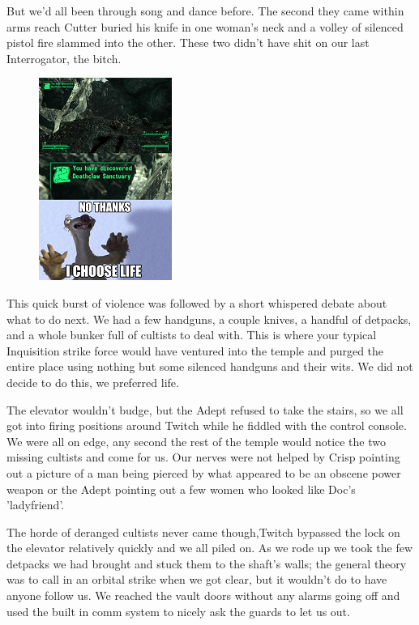 But we'd all been through song and dance before. 
The second they came within arms reach Cutter buried his knife in one woman's neck and a volley of silenced pistol fire slammed into the other. 
These two didn't have shit on our last Interrogator, the bitch.

\begin{figure}
	\begin{center}
		\includegraphics[width=\figwidth]{pics/6/17.png}
	\end{center}
\end{figure}
This quick burst of violence was followed by a short whispered debate about what to do next. 
We had a few handguns, a couple knives, a handful of detpacks, and a whole bunker full of cultists to deal with. 
This is where your typical Inquisition strike force would have ventured into the temple and purged the entire place using nothing but some silenced handguns and their wits. 
We did not decide to do this, we preferred life. %

The elevator wouldn't budge, but the Adept refused to take the stairs, so we all got into firing positions around Twitch while he fiddled with the control console. We were all on edge, any second the rest of the temple would notice the two missing cultists and come for us. Our nerves were not helped by Crisp pointing out a picture of a man being pierced by what appeared to be an obscene power weapon or the Adept pointing out a few women who looked like Doc's 'ladyfriend'.

The horde of deranged cultists never came though,Twitch bypassed the lock on the elevator relatively quickly and we all piled on. As we rode up we took the few detpacks we had brought and stuck them to the shaft's walls; the general theory was to call in an orbital strike when we got clear, but it wouldn't do to have anyone follow us. We reached the vault doors without any alarms going off and used the built in comm system to nicely ask the guards to let us out.


